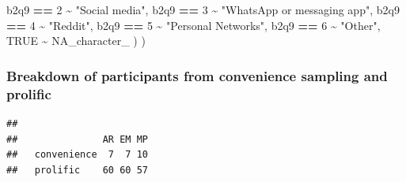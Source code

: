 \documentclass[
]{article}
\newenvironment{Shaded}{\begin{snugshade}}{\end{snugshade}}
\newcommand{\AttributeTok}[1]{\textcolor[rgb]{0.13,0.29,0.53}{#1}}
\newcommand{\CommentTok}[1]{\textcolor[rgb]{0.56,0.35,0.01}{\textit{#1}}}
\newcommand{\ConstantTok}[1]{\textcolor[rgb]{0.56,0.35,0.01}{#1}}
\newcommand{\DecValTok}[1]{\textcolor[rgb]{0.00,0.00,0.81}{#1}}
\newcommand{\FunctionTok}[1]{\textcolor[rgb]{0.13,0.29,0.53}{\textbf{#1}}}
\newcommand{\NormalTok}[1]{#1}
\newcommand{\OtherTok}[1]{\textcolor[rgb]{0.56,0.35,0.01}{#1}}
\newcommand{\SpecialCharTok}[1]{\textcolor[rgb]{0.81,0.36,0.00}{\textbf{#1}}}
\newcommand{\StringTok}[1]{\textcolor[rgb]{0.31,0.60,0.02}{#1}}
\begin{document}
\begin{Shaded}
\begin{Highlighting}[]
\NormalTok{      b2q9 }\SpecialCharTok{==} \DecValTok{2} \SpecialCharTok{\textasciitilde{}} \StringTok{"Social media"}\NormalTok{,}
\NormalTok{      b2q9 }\SpecialCharTok{==} \DecValTok{3} \SpecialCharTok{\textasciitilde{}} \StringTok{"WhatsApp or messaging app"}\NormalTok{,}
\NormalTok{      b2q9 }\SpecialCharTok{==} \DecValTok{4} \SpecialCharTok{\textasciitilde{}} \StringTok{"Reddit"}\NormalTok{,}
\NormalTok{      b2q9 }\SpecialCharTok{==} \DecValTok{5} \SpecialCharTok{\textasciitilde{}} \StringTok{"Personal Networks"}\NormalTok{,}
\NormalTok{      b2q9 }\SpecialCharTok{==} \DecValTok{6} \SpecialCharTok{\textasciitilde{}} \StringTok{"Other"}\NormalTok{,}
      \ConstantTok{TRUE} \SpecialCharTok{\textasciitilde{}} \ConstantTok{NA\_character\_}
\NormalTok{    )}
\NormalTok{  )}
\end{Highlighting}
\end{Shaded}

\subsubsection{Breakdown of participants from convenience sampling and
prolific}\label{breakdown-of-participants-from-convenience-sampling-and-prolific}

\begin{Shaded}
\end{Shaded}

\begin{verbatim}
##              
##               AR EM MP
##   convenience  7  7 10
##   prolific    60 60 57
\end{verbatim}
\end{document}
